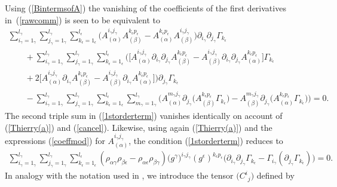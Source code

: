 \documentclass[pdftex]{sigma}
\numberwithin{equation}{section}
\newcommand{\mgamma}{m_{\gamma}}
\newcommand{\igamma}{i_{\gamma}}
\newcommand{\jgamma}{j_{\gamma}}
\newcommand{\lgamma}{l_{\gamma}}
\newcommand{\kepsilon}{k_{\epsilon}}
\newcommand{\pepsilon}{p_{\epsilon}}
\newcommand{\lepsilon}{l_{\epsilon}}
\begin{document}
Using (\ref{BintermsofA}) the vanishing of the coefficients of the first derivatives in~(\ref{rawcomm}) is seen to be equivalent to
\begin{gather}
\sum_{\igamma = 1_{\gamma}}^{\lgamma}\sum_{\jgamma = 1_{\gamma}}^{\lgamma}\sum_{\kepsilon =1_{\epsilon}}^{\lepsilon}\big(A_{(\alpha)}^{\igamma \jgamma}A_{(\beta)}^{\kepsilon \pepsilon}-A_{(\alpha)}^{\kepsilon \pepsilon}A_{(\beta)}^{\igamma \jgamma}\big)\partial_{\igamma}\partial_{\jgamma}\Gamma_{\kepsilon}\nonumber\\
\qquad{} +\sum_{\igamma = 1_{\gamma}}^{\lgamma}\sum_{\jgamma = 1_{\gamma}}^{\lgamma}\sum_{\kepsilon =1_{\epsilon}}^{\lepsilon}\big(\big[A_{(\alpha)}^{\igamma \jgamma}\partial_{\igamma}\partial_{\jgamma}A_{(\beta)}^{\kepsilon \pepsilon}-A_{(\beta)}^{\igamma \jgamma}\partial_{\igamma}\partial_{\jgamma}A_{(\alpha)}^{\kepsilon \pepsilon}\big]\Gamma_{\kepsilon}\nonumber\\
\qquad{} +2\big[A_{(\alpha)}^{\igamma \jgamma}\partial_{\igamma}A_{(\beta)}^{\kepsilon \pepsilon}-A_{(\beta)}^{\igamma \jgamma}\partial_{\igamma}A_{(\alpha)}^{\kepsilon \pepsilon}\big]\big)\partial_{\jgamma}\Gamma_{\kepsilon}\nonumber\\
\qquad{} -\sum_{\igamma = 1_{\gamma}}^{\lgamma}\sum_{\jgamma = 1_{\gamma}}^{\lgamma}\sum_{\kepsilon =1_{\epsilon}}^{\lepsilon}\sum_{\mgamma =1_{\gamma}}^{\lgamma}\big(A_{(\alpha)}^{\mgamma \jgamma}\partial_{\jgamma}\big(A_{(\beta)}^{\kepsilon \pepsilon}\Gamma_{\kepsilon}\big)-A_{(\beta)}^{\mgamma \jgamma}\partial_{\jgamma}\big(A_{(\alpha)}^{\kepsilon \pepsilon}\Gamma_{\kepsilon}\big)\big)=0.\label{1storderterm}
\end{gather}
The second triple sum in (\ref{1storderterm}) vanishes identically on account of (\ref{Thierry(a)}) and (\ref{cancel}). Likewise, using again (\ref{Thierry(a)}) and the expressions (\ref{coeffmod}) for $A_{(\alpha)}^{\igamma \jgamma}$, the condition (\ref{1storderterm}) reduces to
\begin{gather}\label{1storderfinal}
\sum_{\igamma = 1_{\gamma}}^{\lgamma}\sum_{\jgamma = 1_{\gamma}}^{\lgamma}\sum_{\kepsilon =1_{\epsilon}}^{\lepsilon}(\rho_{\alpha \gamma}\rho_{\beta \epsilon}-\rho_{\alpha \epsilon}\rho_{\beta \gamma}) \big(g^{\gamma}\big)^{\igamma \jgamma}(g^{\epsilon})^{\kepsilon \pepsilon}\big(\partial_{\igamma}\partial_{\jgamma}\Gamma_{\kepsilon}-\Gamma_{\igamma}(\partial_{\jgamma}\Gamma_{\kepsilon})\big)=0.
\end{gather}
In analogy with the notation used in \cite{BCR2-2002}, we introduce the tensor $\big({C^{i}}_{j}\big)$ defined by
\end{document}
